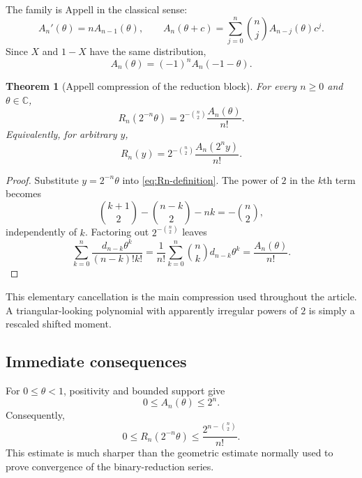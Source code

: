 \documentclass[11pt,oneside]{article}
\newtheorem{theorem}{Theorem}[section]
\theoremstyle{definition}
\theoremstyle{remark}
\newcommand{\C}{\mathbb C}
\begin{document}
The family is Appell in the classical sense:
\begin{equation}\label{eq:Appell-derivative}
  A_n'(\theta)=nA_{n-1}(\theta),
  \qquad
  A_n(\theta+c)=\sum_{j=0}^{n}\binom nj A_{n-j}(\theta)c^j.
\end{equation}
Since $X$ and $1-X$ have the same distribution,
\begin{equation}\label{eq:Appell-reflection}
  A_n(\theta)=(-1)^nA_n(-1-\theta).
\end{equation}

\begin{theorem}[Appell compression of the reduction block]\label{thm:Appell-compression}
For every $n\ge0$ and $\theta\in\C$,
\begin{equation}\label{eq:Appell-compression}
  R_n(2^{-n}\theta)
  =2^{-\binom n2}\frac{A_n(\theta)}{n!}.
\end{equation}
Equivalently, for arbitrary $y$,
\begin{equation}\label{eq:R-Appell-general}
  R_n(y)=2^{-\binom n2}\frac{A_n(2^ny)}{n!}.
\end{equation}
\end{theorem}

\begin{proof}
Substitute $y=2^{-n}\theta$ into \eqref{eq:Rn-definition}.  The power of $2$
in the $k$th term becomes
\[
 \binom{k+1}{2}-\binom{n-k}{2}-nk=-\binom n2,
\]
independently of $k$.  Factoring out $2^{-\binom n2}$ leaves
\[
 \sum_{k=0}^{n}\frac{d_{n-k}\theta^k}{(n-k)!k!}
 =\frac1{n!}\sum_{k=0}^{n}\binom nkd_{n-k}\theta^k
 =\frac{A_n(\theta)}{n!}.
\]
\end{proof}

This elementary cancellation is the main compression used throughout the
article.  A triangular-looking polynomial with apparently irregular powers of
$2$ is simply a rescaled shifted moment.

\subsection{Immediate consequences}

For $0\le\theta<1$, positivity and bounded support give
\begin{equation}\label{eq:Appell-bound}
  0\le A_n(\theta)\le 2^n.
\end{equation}
Consequently,
\begin{equation}\label{eq:R-superbound}
  0\le R_n(2^{-n}\theta)
  \le \frac{2^{n-\binom n2}}{n!}.
\end{equation}
This estimate is much sharper than the geometric estimate normally used to
prove convergence of the binary-reduction series.
\end{document}
